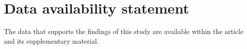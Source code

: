 \documentclass[aip,jcp,reprint,noshowkeys,superscriptaddress]{revtex4-1}
\begin{document}
\twocolumngrid
\section*{Data availability statement}
The data that supports the findings of this study are available within the article and its supplementary material.


\end{document}
